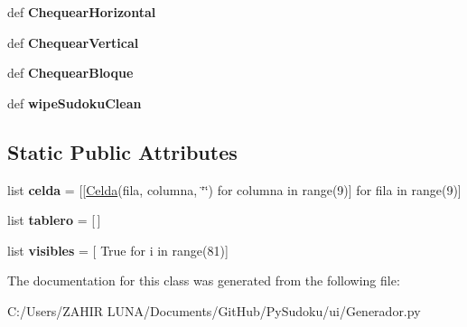 \begin{DoxyCompactItemize}
\item 
\hypertarget{class_generador_1_1_generador_aa143e691cf3301a3ff0a1bc3a56bd172}{def {\bfseries Chequear\-Horizontal}}\label{class_generador_1_1_generador_aa143e691cf3301a3ff0a1bc3a56bd172}

\item 
\hypertarget{class_generador_1_1_generador_af5fa571c200c831435c9614b7369c62b}{def {\bfseries Chequear\-Vertical}}\label{class_generador_1_1_generador_af5fa571c200c831435c9614b7369c62b}

\item 
\hypertarget{class_generador_1_1_generador_aa641c9a08ddfbc84486a0504808fc436}{def {\bfseries Chequear\-Bloque}}\label{class_generador_1_1_generador_aa641c9a08ddfbc84486a0504808fc436}

\item 
\hypertarget{class_generador_1_1_generador_aa935397ae17f757fe5d502b5d81c054e}{def {\bfseries wipe\-Sudoku\-Clean}}\label{class_generador_1_1_generador_aa935397ae17f757fe5d502b5d81c054e}

\end{DoxyCompactItemize}
\subsection*{Static Public Attributes}
\begin{DoxyCompactItemize}
\item 
\hypertarget{class_generador_1_1_generador_ab2abe734ee6c095b8a52a03a23e17214}{list {\bfseries celda} = \mbox{[}\mbox{[}\hyperlink{class_generador_1_1_celda}{Celda}(fila, columna, \char`\"{}\char`\"{}) for columna in range(9)\mbox{]} for fila in range(9)\mbox{]}}\label{class_generador_1_1_generador_ab2abe734ee6c095b8a52a03a23e17214}

\item 
\hypertarget{class_generador_1_1_generador_a4a647468e6701f0c59c6e315a3f584e6}{list {\bfseries tablero} = \mbox{[}$\,$\mbox{]}}\label{class_generador_1_1_generador_a4a647468e6701f0c59c6e315a3f584e6}

\item 
\hypertarget{class_generador_1_1_generador_a03d94dc4bfee76deba76eed6ec44bac0}{list {\bfseries visibles} = \mbox{[} True for i in range(81)\mbox{]}}\label{class_generador_1_1_generador_a03d94dc4bfee76deba76eed6ec44bac0}

\end{DoxyCompactItemize}


The documentation for this class was generated from the following file\-:\begin{DoxyCompactItemize}
\item 
C\-:/\-Users/\-Z\-A\-H\-I\-R  L\-U\-N\-A/\-Documents/\-Git\-Hub/\-Py\-Sudoku/ui/Generador.\-py\end{DoxyCompactItemize}

